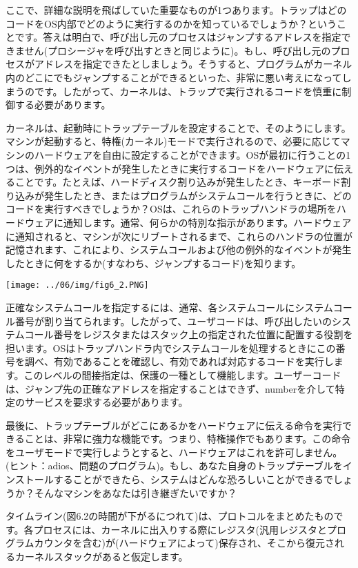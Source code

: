 ここで、詳細な説明を飛ばしていた重要なものが1つあります。トラップはどのコードをOS内部でどのように実行するのかを知っているでしょうか？ということです。答えは明白で、呼び出し元のプロセスはジャンプするアドレスを指定できません(プロシージャを呼び出すときと同じように)。もし、呼び出し元のプロセスがアドレスを指定できたとしましょう。そうすると、プログラムがカーネル内のどこにでもジャンプすることができるといった、非常に悪い考えになってしまうのです。したがって、カーネルは、トラップで実行されるコードを慎重に制御する必要があります。

カーネルは、起動時にトラップテーブルを設定することで、そのようにします。マシンが起動すると、特権(カーネル)モードで実行されるので、必要に応じてマシンのハードウェアを自由に設定することができます。OSが最初に行うことの1つは、例外的なイベントが発生したときに実行するコードをハードウェアに伝えることです。たとえば、ハードディスク割り込みが発生したとき、キーボード割り込みが発生したとき、またはプログラムがシステムコールを行うときに、どのコードを実行すべきでしょうか？OSは、これらのトラップハンドラの場所をハードウェアに通知します。通常、何らかの特別な指示があります。ハードウェアに通知されると、マシンが次にリブートされるまで、これらのハンドラの位置が記憶されます、これにより、システムコールおよび他の例外的なイベントが発生したときに何をするか(すなわち、ジャンプするコード)を知ります。

\texttt{[image: ../06/img/fig6\_2.PNG]}

正確なシステムコールを指定するには、通常、各システムコールにシステムコール番号が割り当てられます。したがって、ユーザコードは、呼び出したいのシステムコール番号をレジスタまたはスタック上の指定された位置に配置する役割を担います。OSはトラップハンドラ内でシステムコールを処理するときにこの番号を調べ、有効であることを確認し、有効であれば対応するコードを実行します。このレベルの間接指定は、保護の一種として機能します。ユーザーコードは、ジャンプ先の正確なアドレスを指定することはできず、numberを介して特定のサービスを要求する必要があります。

最後に、トラップテーブルがどこにあるかをハードウェアに伝える命令を実行できることは、非常に強力な機能です。つまり、特権操作でもあります。この命令をユーザモードで実行しようとすると、ハードウェアはこれを許可しません。(ヒント：adios、問題のプログラム)。もし、あなた自身のトラップテーブルをインストールすることができたら、システムはどんな恐ろしいことができるでしょうか？そんなマシンをあなたは引き継ぎたいですか？

タイムライン(図6.2の時間が下がるにつれて)は、プロトコルをまとめたものです。各プロセスには、カーネルに出入りする際にレジスタ(汎用レジスタとプログラムカウンタを含む)が(ハードウェアによって)保存され、そこから復元されるカーネルスタックがあると仮定します。


